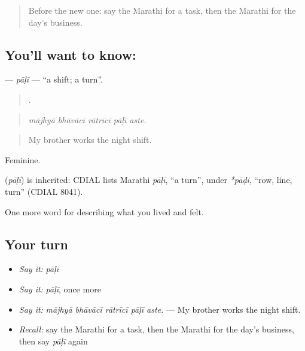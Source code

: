 \begin{quote}
Before the new one: say the Marathi for a task, then the Marathi for the day's business.
\end{quote}

\subsection*{You'll want to know: }
\textbf{} — \emph{pāḷī} — \textquotedblleft{}a shift; a turn\textquotedblright{}.

\begin{quote}
    .
\end{quote}

\begin{quote}
\emph{mājhyā bhāvācī rātrīcī pāḷī aste.}
\end{quote}

\begin{quote}
My brother works the night shift.
\end{quote}

Feminine.

\begin{cousinweb}
\textbf{} (\emph{pāḷī}) is inherited: CDIAL lists Marathi \emph{pāḷī}, \textquotedblleft{}a turn\textquotedblright{}, under \emph{*pāḍi}, \textquotedblleft{}row, line, turn\textquotedblright{} (CDIAL 8041).
\end{cousinweb}

\begin{grammarlens}[title={What you've built}]
One more word for describing what you lived and felt.
\end{grammarlens}

\subsection*{Your turn}
\begin{itemize}
\raggedright
  \item \emph{Say it:} \emph{pāḷī}
  \item \emph{Say it:} \emph{pāḷī}, once more
  \item \emph{Say it:} \emph{mājhyā bhāvācī rātrīcī pāḷī aste.} — My brother works the night shift.
  \item \emph{Recall:} say the Marathi for a task, then the Marathi for the day's business, then say \emph{pāḷī} again
\end{itemize}

